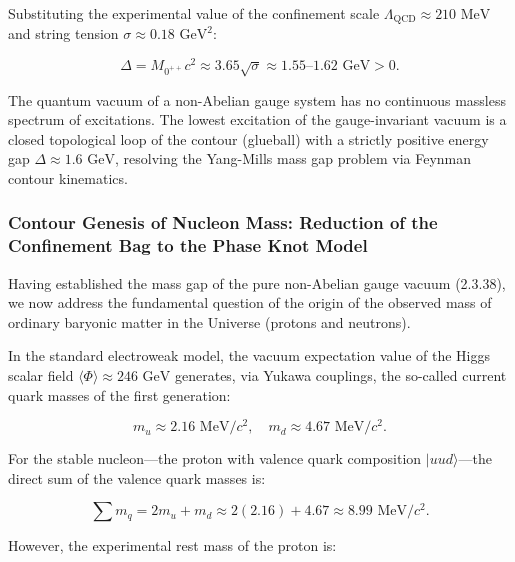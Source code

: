 Substituting the experimental value of the confinement scale $\Lambda_{\text{QCD}} \approx 210\text{ MeV}$ and string tension $\sigma \approx 0.18\text{ GeV}^2$:

\begin{equation}\label{eq:2.3.38}\tag{2.3.38}
\Delta = M_{0^{++}} c^2 \approx 3.65 \sqrt{\sigma} \approx 1.55\text{--}1.62\text{ GeV} > 0.
\end{equation}

\begin{theorem}\label{thm:2.3.4}
The quantum vacuum of a non-Abelian gauge system has no continuous massless spectrum of excitations. The lowest excitation of the gauge-invariant vacuum is a closed topological loop of the contour (glueball) with a strictly positive energy gap $\Delta \approx 1.6\text{ GeV}$, resolving the Yang-Mills mass gap problem via Feynman contour kinematics.
\end{theorem}

\subsubsection{Contour Genesis of Nucleon Mass: Reduction of the Confinement Bag to the Phase Knot Model}\label{sec:2.3.7}

Having established the mass gap of the pure non-Abelian gauge vacuum (2.3.38), we now address the fundamental question of the origin of the observed mass of ordinary baryonic matter in the Universe (protons and neutrons).

In the standard electroweak model, the vacuum expectation value of the Higgs scalar field $\langle \Phi \rangle \approx 246\text{ GeV}$ generates, via Yukawa couplings, the so-called current quark masses of the first generation:

\begin{equation}\label{eq:2.3.39}\tag{2.3.39}
m_u \approx 2.16\text{ MeV}/c^2, \quad m_d \approx 4.67\text{ MeV}/c^2.
\end{equation}

For the stable nucleon---the proton with valence quark composition $|uud\rangle$---the direct sum of the valence quark masses is:

\begin{equation}\label{eq:2.3.40}\tag{2.3.40}
\sum m_q = 2 m_u + m_d \approx 2(2.16) + 4.67 \approx 8.99\text{ MeV}/c^2.
\end{equation}

However, the experimental rest mass of the proton is:

